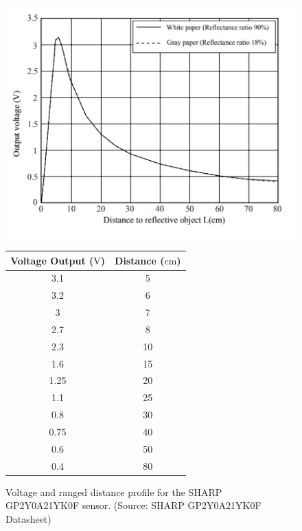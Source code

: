 \documentclass[a4paper]{article}
\begin{document}
\begin{figure}[h]
\centering
\begin{minipage}[c]{0.45\textwidth}
\centering
\includegraphics[scale=0.5]{GP2Y_long}
\caption{Voltage and ranged distance profile for the SHARP GP2Y0A21YK0F sensor. (Source: SHARP GP2Y0A21YK0F Datasheet)}
\end{minipage}
\hspace{1cm}
\begin{minipage}{0.45\textwidth}
\centering
{}
\begin{tabular}[c]{cc}
\toprule
\textbf{Voltage Output ($\si{\volt}$)} & \textbf{Distance ($\si{\centi\meter}$)}\\
\midrule
3.1 & 5\\
3.2 & 6\\
3 & 7\\
2.7 & 8\\
2.3 & 10\\
1.6 & 15\\
1.25 & 20\\
1.1 & 25\\
0.8 & 30\\
0.75 & 40\\
0.6 & 50\\
0.4 & 80\\
\bottomrule
\end{tabular}
\end{minipage}
\end{figure}

\clearpage
\end{document}
